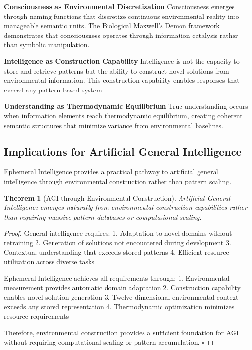 \documentclass[12pt,a4paper]{article}
\newtheorem{theorem}{Theorem}
\begin{document}
\textbf{Consciousness as Environmental Discretization}
Consciousness emerges through naming functions that discretize continuous environmental reality into manageable semantic units. The Biological Maxwell's Demon framework demonstrates that consciousness operates through information catalysis rather than symbolic manipulation.

\textbf{Intelligence as Construction Capability}
Intelligence is not the capacity to store and retrieve patterns but the ability to construct novel solutions from environmental information. This construction capability enables responses that exceed any pattern-based system.

\textbf{Understanding as Thermodynamic Equilibrium}
True understanding occurs when information elements reach thermodynamic equilibrium, creating coherent semantic structures that minimize variance from environmental baselines.

\subsection{Implications for Artificial General Intelligence}

Ephemeral Intelligence provides a practical pathway to artificial general intelligence through environmental construction rather than pattern scaling.

\begin{theorem}[AGI through Environmental Construction]
Artificial General Intelligence emerges naturally from environmental construction capabilities rather than requiring massive pattern databases or computational scaling.
\end{theorem}

\begin{proof}
General intelligence requires:
1. Adaptation to novel domains without retraining
2. Generation of solutions not encountered during development
3. Contextual understanding that exceeds stored patterns
4. Efficient resource utilization across diverse tasks

Ephemeral Intelligence achieves all requirements through:
1. Environmental measurement provides automatic domain adaptation
2. Construction capability enables novel solution generation
3. Twelve-dimensional environmental context exceeds any stored representation
4. Thermodynamic optimization minimizes resource requirements

Therefore, environmental construction provides a sufficient foundation for AGI without requiring computational scaling or pattern accumulation. $\square$
\end{proof}
\end{document}
